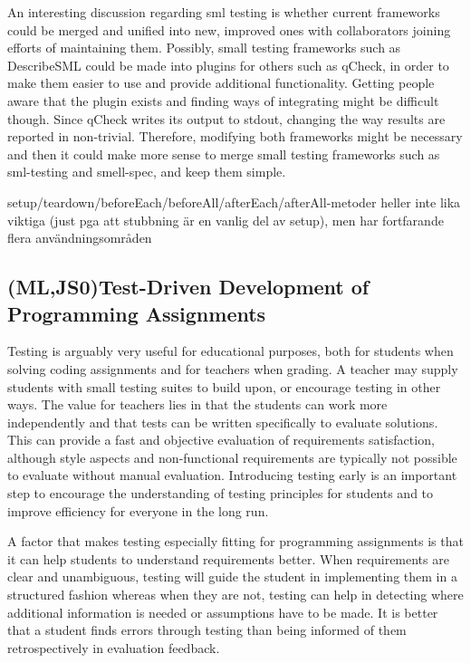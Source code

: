 \documentclass[11pt]{article}
\begin{document}
An interesting discussion regarding \gls{sml} testing is whether current frameworks could be merged and unified into new, improved ones with collaborators joining efforts of maintaining them. Possibly, small testing frameworks such as DescribeSML could be made into plugins for others such as qCheck, in order to make them easier to use and provide additional functionality. Getting people aware that the plugin exists and finding ways of integrating might be difficult though. Since qCheck writes its output to stdout, changing the way results are reported in non-trivial. Therefore, modifying both frameworks might be necessary and then it could make more sense to merge small testing frameworks such as sml-testing and smell-spec, and keep them simple.



setup/teardown/beforeEach/beforeAll/afterEach/afterAll-metoder heller inte lika viktiga (just pga att stubbning är en vanlig del av setup), men har fortfarande flera användningsområden

\subsection{(ML,JS0)Test-Driven Development of Programming Assignments}
\label{subsec:tddmooc}

Testing is arguably very useful for educational purposes, both for students when solving coding assignments and for teachers when grading.
A teacher may supply students with small testing suites to build upon, or encourage testing in other ways.
The value for teachers lies in that the students can work more independently and that tests can be written specifically to evaluate solutions.
This can provide a fast and objective evaluation of requirements satisfaction, although style aspects and non-functional requirements are typically not possible to evaluate without manual evaluation.
Introducing testing early is an important step to encourage the understanding of testing principles for students and to improve efficiency for everyone in the long run.

A factor that makes testing especially fitting for programming assignments is that it can help students to understand requirements better.
When requirements are clear and unambiguous, testing will guide the student in implementing them in a structured fashion whereas when they are not, testing can help in detecting where additional information is needed or assumptions have to be made.
It is better that a student finds errors through testing than being informed of them retrospectively in evaluation feedback.
\end{document}
